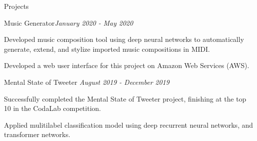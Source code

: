 \documentclass{resume} %
\begin{document}
\begin{rSection}{Projects}

%






\begin{rSubsection}{Music Generator}{\em January 2020 - May 2020}{}{}
\item Developed music composition tool using deep neural networks to automatically generate, extend, and stylize imported music compositions in MIDI. 
\item Developed a web user interface for this project on Amazon Web Services (AWS).
\end{rSubsection}



\begin{rSubsection}{Mental State of Tweeter }{\em August 2019 - December 2019}{}{}
\item Successfully completed the Mental State of Tweeter project, finishing at the top 10 in the CodaLab competition.
\item Applied mulitilabel classification model using deep recurrent neural networks, and transformer networks.
\end{rSubsection}


\end{rSection}
\end{document}
